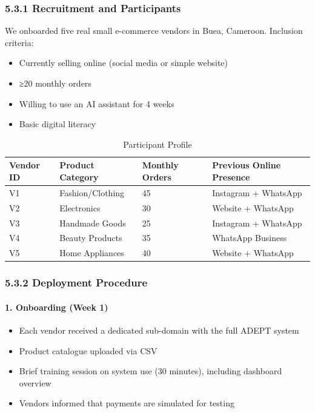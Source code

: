\documentclass[12pt,a4paper]{article}
\begin{document}
\subsubsection{5.3.1 Recruitment and Participants}

We onboarded five real small e-commerce vendors in Buea, Cameroon. Inclusion criteria:

\begin{itemize}
    \item Currently selling online (social media or simple website)
    \item ≥20 monthly orders
    \item Willing to use an AI assistant for 4 weeks
    \item Basic digital literacy
\end{itemize}

\begin{table}[h]
\centering
\caption{Participant Profile}
\label{tab:participants}
\begin{tabular}{p{3cm}p{4cm}p{3cm}p{4cm}}
\toprule
\textbf{Vendor ID} & \textbf{Product Category} & \textbf{Monthly Orders} & \textbf{Previous Online Presence} \\
\midrule
V1 & Fashion/Clothing & 45 & Instagram + WhatsApp \\
V2 & Electronics & 30 & Website + WhatsApp \\
V3 & Handmade Goods & 25 & Instagram + WhatsApp \\
V4 & Beauty Products & 35 & WhatsApp Business \\
V5 & Home Appliances & 40 & Website + WhatsApp \\
\bottomrule
\end{tabular}
\end{table}

\subsubsection{5.3.2 Deployment Procedure}

\paragraph{1. Onboarding (Week 1)}

\begin{itemize}
    \item Each vendor received a dedicated sub-domain with the full ADEPT system
    \item Product catalogue uploaded via CSV
    \item Brief training session on system use (30 minutes), including dashboard overview
    \item Vendors informed that payments are simulated for testing
\end{itemize}
\end{document}
